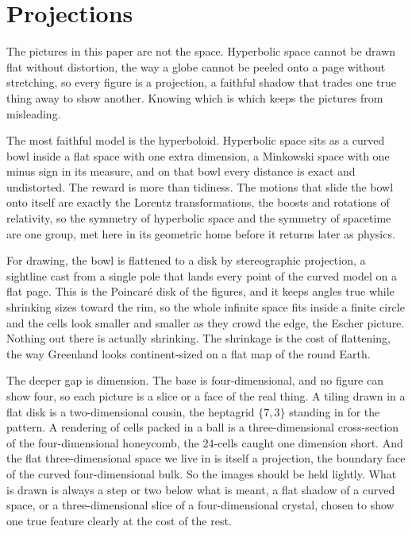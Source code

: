 \section{Projections}

The pictures in this paper are not the space. Hyperbolic space cannot be drawn flat without distortion, the way a globe cannot be peeled onto a page without stretching, so every figure is a projection, a faithful shadow that trades one true thing away to show another. Knowing which is which keeps the pictures from misleading.

The most faithful model is the hyperboloid. Hyperbolic space sits as a curved bowl inside a flat space with one extra dimension, a Minkowski space with one minus sign in its measure, and on that bowl every distance is exact and undistorted. The reward is more than tidiness. The motions that slide the bowl onto itself are exactly the Lorentz transformations, the boosts and rotations of relativity, so the symmetry of hyperbolic space and the symmetry of spacetime are one group, met here in its geometric home before it returns later as physics.

For drawing, the bowl is flattened to a disk by stereographic projection, a sightline cast from a single pole that lands every point of the curved model on a flat page. This is the Poincar\'e disk of the figures, and it keeps angles true while shrinking sizes toward the rim, so the whole infinite space fits inside a finite circle and the cells look smaller and smaller as they crowd the edge, the Escher picture. Nothing out there is actually shrinking. The shrinkage is the cost of flattening, the way Greenland looks continent-sized on a flat map of the round Earth.

The deeper gap is dimension. The base is four-dimensional, and no figure can show four, so each picture is a slice or a face of the real thing. A tiling drawn in a flat disk is a two-dimensional cousin, the heptagrid $\{7,3\}$ standing in for the pattern. A rendering of cells packed in a ball is a three-dimensional cross-section of the four-dimensional honeycomb, the 24-cells caught one dimension short. And the flat three-dimensional space we live in is itself a projection, the boundary face of the curved four-dimensional bulk. So the images should be held lightly. What is drawn is always a step or two below what is meant, a flat shadow of a curved space, or a three-dimensional slice of a four-dimensional crystal, chosen to show one true feature clearly at the cost of the rest.
